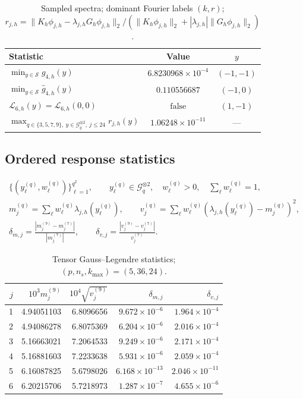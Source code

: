 \begin{table}[htbp]
\centering\small
\caption{Sampled spectra; dominant Fourier labels $(k,r)$; $r_{j,h}=\|K_h\phi_{j,h}-\lambda_{j,h}G_h\phi_{j,h}\|_2/(\|K_h\phi_{j,h}\|_2+|\lambda_{j,h}|\|G_h\phi_{j,h}\|_2)$.}\label{tab:theory-gaps}
\begin{tabular}{lcc}
\hline
Statistic & Value & $y$\\
\hline
$\min_{y\in\mathcal S}g_{4,h}(y)$ & $6.8230968\times10^{-4}$ & $(-1,-1)$\\
$\min_{y\in\mathcal S}\widehat g_{4,h}(y)$ & $0.110556687$ & $(-1,0)$\\
$\mathcal L_{6,h}(y)=\mathcal L_{6,h}(0,0)$ & $\mathrm{false}$ & $(1,-1)$\\
$\max_{q\in\{3,5,7,9\},\ y\in\mathcal G_q^{\otimes2},\ j\leq24} r_{j,h}(y)$ & $1.06248\times10^{-11}$ & ---\\
\hline
\end{tabular}
\end{table}
\subsection{Ordered response statistics}
\begin{gather}
 \{(y_\ell^{(q)},w_\ell^{(q)})\}_{\ell=1}^{q^2},\qquad
 y_\ell^{(q)}\in\mathcal G_q^{\otimes2},\quad
 w_\ell^{(q)}>0,\quad\sum_\ell w_\ell^{(q)}=1,\\
 m_j^{(q)}=\sum_\ell w_\ell^{(q)}\lambda_{j,h}(y_\ell^{(q)}),\qquad
 v_j^{(q)}=\sum_\ell w_\ell^{(q)}
       (\lambda_{j,h}(y_\ell^{(q)})-m_j^{(q)})^2,\\
 \delta_{m,j}=\frac{|m_j^{(9)}-m_j^{(7)}|}{|m_j^{(7)}|},\qquad
 \delta_{v,j}=\frac{|v_j^{(9)}-v_j^{(7)}|}{v_j^{(7)}}.
\end{gather}
\begin{table}[htbp]
\centering\small
\caption{Tensor Gauss--Legendre statistics; $(p,n_s,k_{\max})=(5,36,24)$.}\label{tab:theory-moments}
\begin{tabular}{rrrrr}
\hline
$j$ & $10^3m_j^{(9)}$ & $10^4\sqrt{v_j^{(9)}}$ & $\delta_{m,j}$ & $\delta_{v,j}$\\
\hline
1 & 4.94051103 & 6.8096656 & $9.672\times10^{-6}$ & $1.964\times10^{-4}$\\
2 & 4.94086278 & 6.8075369 & $6.204\times10^{-6}$ & $2.016\times10^{-4}$\\
3 & 5.16663021 & 7.2064533 & $9.249\times10^{-6}$ & $2.171\times10^{-4}$\\
4 & 5.16881603 & 7.2233638 & $5.931\times10^{-6}$ & $2.059\times10^{-4}$\\
5 & 6.16087825 & 5.6798026 & $6.168\times10^{-13}$ & $2.046\times10^{-11}$\\
6 & 6.20215706 & 5.7218973 & $1.287\times10^{-7}$ & $4.655\times10^{-6}$\\
\hline
\end{tabular}
\end{table}

